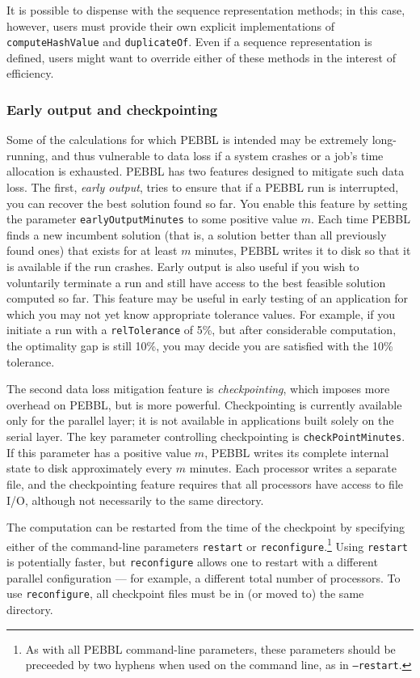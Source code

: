 It is possible to dispense with the sequence representation methods;
in this case, however, users must provide their own explicit
implementations of \texttt{computeHashValue} and
\texttt{duplicateOf}.  Even if a sequence representation is defined,
users might want to override either of these methods in the interest
of efficiency.


\subsubsection{Early output and checkpointing}

Some of the calculations for which PEBBL is intended may be extremely
long-running, and thus vulnerable to data loss if a system crashes
or a job's time allocation is exhausted.  PEBBL has two features
designed to mitigate such data loss.  The first, \emph{early output},
tries to ensure that if a PEBBL run is interrupted, you can recover
the best solution found so far.  You enable this feature by setting
the parameter \texttt{earlyOutputMinutes} to some positive value $m$.
Each time PEBBL finds a new incumbent solution (that is, a solution
better than all previously found ones) that exists for at least $m$
minutes, PEBBL writes it to disk so that it is available if
the run crashes. Early output is also useful if you wish to
voluntarily terminate a run and still have access to the best feasible
solution computed so far.  
This feature may be useful in early testing of an application for which you
may not yet know appropriate tolerance values.  For example, if you initiate
a run with a \texttt{relTolerance} of 5\%, but after considerable computation,
the optimality 
gap is still 10\%, you may decide you are satisfied with the 10\%
tolerance.

The second data loss mitigation feature is \emph{checkpointing}, which
imposes more overhead on PEBBL, but is more powerful.  Checkpointing is
currently available only for the parallel layer; it is not available
in applications built solely on the serial layer.  The key parameter
controlling checkpointing is \texttt{checkPointMinutes}.  If this
parameter has a positive value $m$, PEBBL writes its complete
internal state to disk approximately every $m$ minutes. Each processor
writes a separate file, and the checkpointing feature requires that
all processors have access to file I/O, although not necessarily to the
same directory.

The computation can be restarted from the time of the checkpoint by
specifying either of the command-line parameters \texttt{restart} or
\texttt{reconfigure}.\footnote{As with all PEBBL command-line
  parameters, these parameters should be preceeded by two hyphens when
  used on the command line, as in \texttt{--restart}.} 
Using \texttt{restart} is potentially faster, but
\texttt{reconfigure} allows one to restart with a different parallel
configuration --- for example, a different total number of processors.
To use \texttt{reconfigure}, all checkpoint files must be in (or moved
to) the same directory.


